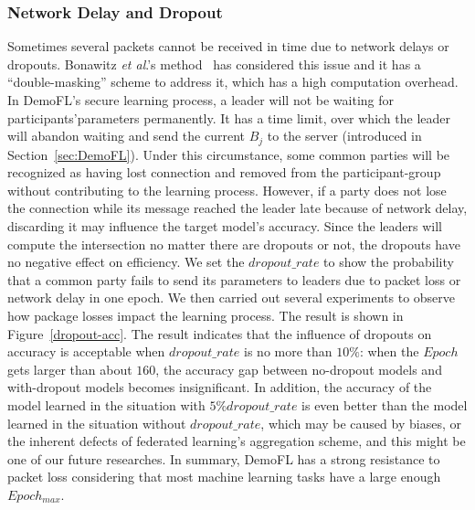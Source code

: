 \subsubsection{Network Delay and Dropout}
Sometimes several packets cannot be received in time due to network delays or dropouts. Bonawitz \emph{et al}.'s method~\cite{Practical} has considered this issue and it has a ``double-masking'' scheme to address it, which has a high computation overhead. In DemoFL's secure learning process, a leader will not be waiting for participants'parameters permanently. It has a time limit, over which the leader will abandon waiting and send the current $B_j$ to the server (introduced in Section~\ref{sec:DemoFL}). Under this circumstance, some common parties will be recognized as having lost connection and removed from the participant-group without contributing to the learning process. However, if a party does not lose the connection while its message reached the leader late because of network delay, discarding it may influence the target model's accuracy. Since the leaders will compute the intersection no matter there are dropouts or not, the dropouts have no negative effect on efficiency. We set the $dropout\_rate$ to show the probability that a common party fails to send its parameters to leaders due to packet loss or network delay in one epoch. We then carried out several experiments to observe how package losses impact the learning process. The result is shown in Figure~\ref{dropout-acc}. The result indicates that the influence of dropouts on accuracy is acceptable when $dropout\_rate$ is no more than $10\%$: when the $Epoch$ gets larger than about $160$, the accuracy gap between no-dropout models and with-dropout models becomes insignificant. In addition, the accuracy of the model learned in the situation with $5\% dropout\_rate$ is even better than the model learned in the situation without $dropout\_rate$,  which may be caused by biases, or the inherent defects of federated learning's aggregation scheme, and this might be one of our future researches. In summary, DemoFL has a strong resistance to packet loss considering that most machine learning tasks have a large enough $Epoch_{max}$.